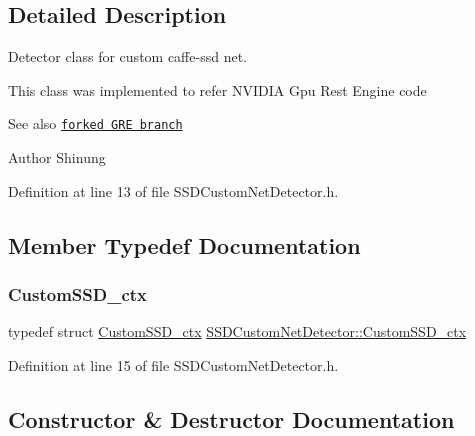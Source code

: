 \subsection{Detailed Description}
Detector class for custom caffe-\/ssd net. 

This class was implemented to refer N\+V\+I\+D\+IA Gpu Rest Engine code

\begin{DoxySeeAlso}{See also}
\href{https://github.com/Shinung/gpu-rest-engine/tree/ssd_gre/caffe_ssd}{\tt forked G\+RE branch} 
\end{DoxySeeAlso}
\begin{DoxyAuthor}{Author}
Shinung 
\end{DoxyAuthor}


Definition at line 13 of file S\+S\+D\+Custom\+Net\+Detector.\+h.



\subsection{Member Typedef Documentation}
\mbox{\label{class_s_s_d_custom_net_detector_a979c7a383a8951d8d549bdf9e1045aae}} 
\subsubsection{\texorpdfstring{Custom\+S\+S\+D\+\_\+ctx}{CustomSSD\_ctx}}
{\footnotesize\ttfamily typedef struct \mbox{\hyperlink{class_s_s_d_custom_net_detector_a979c7a383a8951d8d549bdf9e1045aae}{Custom\+S\+S\+D\+\_\+ctx}} \mbox{\hyperlink{class_s_s_d_custom_net_detector_a979c7a383a8951d8d549bdf9e1045aae}{S\+S\+D\+Custom\+Net\+Detector\+::\+Custom\+S\+S\+D\+\_\+ctx}}\hspace{0.3cm}{\ttfamily [private]}}



Definition at line 15 of file S\+S\+D\+Custom\+Net\+Detector.\+h.



\subsection{Constructor \& Destructor Documentation}
\mbox{\label{class_s_s_d_custom_net_detector_acb89dc911dd7b4b300a00789a76c8d8d}} 
